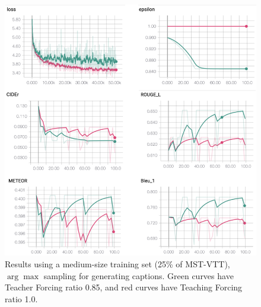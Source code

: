 \documentclass[11pt,a4paper]{article}
\begin{document}
\begin{figure}
    \centering
    \includegraphics[width=\linewidth]{result_med.png}
    \caption{Results using a medium-size training set (25\% of MST-VTT), $\arg\max$ sampling for generating captions. Green curves have Teacher Forcing ratio 0.85, and red curves have Teaching Forcing ratio 1.0.}
    \label{fig:result_med}
\end{figure}
\end{document}
